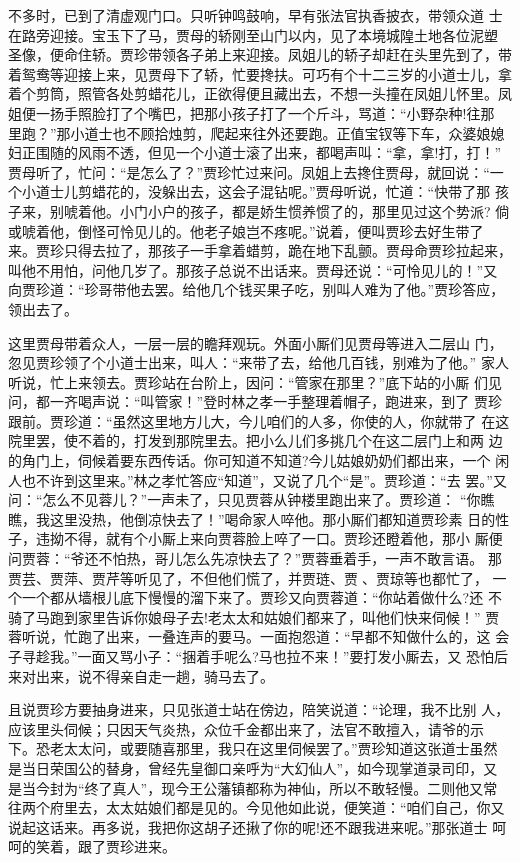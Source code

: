 不多时，已到了清虚观门口。只听钟鸣鼓响，早有张法官执香披衣，带领众道
士在路旁迎接。宝玉下了马，贾母的轿刚至山门以内，见了本境城隍土地各位泥塑
圣像，便命住轿。贾珍带领各子弟上来迎接。凤姐儿的轿子却赶在头里先到了，带
着鸳鸯等迎接上来，见贾母下了轿，忙要搀扶。可巧有个十二三岁的小道士儿，拿
着个剪筒，照管各处剪蜡花儿，正欲得便且藏出去，不想一头撞在凤姐儿怀里。凤
姐便一扬手照脸打了个嘴巴，把那小孩子打了一个斤斗，骂道：“小野杂种!往那
里跑？”那小道士也不顾拾烛剪，爬起来往外还要跑。正值宝钗等下车，众婆娘媳
妇正围随的风雨不透，但见一个小道士滚了出来，都喝声叫：“拿，拿!打，打！”
贾母听了，忙问：“是怎么了？”贾珍忙过来问。凤姐上去搀住贾母，就回说：“一
个小道士儿剪蜡花的，没躲出去，这会子混钻呢。”贾母听说，忙道：“快带了那
孩子来，别唬着他。小门小户的孩子，都是娇生惯养惯了的，那里见过这个势派?
倘或唬着他，倒怪可怜见儿的。他老子娘岂不疼呢。”说着，便叫贾珍去好生带了
来。贾珍只得去拉了，那孩子一手拿着蜡剪，跪在地下乱颤。贾母命贾珍拉起来，
叫他不用怕，问他几岁了。那孩子总说不出话来。贾母还说：“可怜见儿的！”又
向贾珍道：“珍哥带他去罢。给他几个钱买果子吃，别叫人难为了他。”贾珍答应，
领出去了。

这里贾母带着众人，一层一层的瞻拜观玩。外面小厮们见贾母等进入二层山
门，忽见贾珍领了个小道士出来，叫人：“来带了去，给他几百钱，别难为了他。”
家人听说，忙上来领去。贾珍站在台阶上，因问：“管家在那里？”底下站的小厮
们见问，都一齐喝声说：“叫管家！”登时林之孝一手整理着帽子，跑进来，到了
贾珍跟前。贾珍道：“虽然这里地方儿大，今儿咱们的人多，你使的人，你就带了
在这院里罢，使不着的，打发到那院里去。把小么儿们多挑几个在这二层门上和两
边的角门上，伺候着要东西传话。你可知道不知道?今儿姑娘奶奶们都出来，一个
闲人也不许到这里来。”林之孝忙答应“知道”，又说了几个“是”。贾珍道：“去
罢。”又问：“怎么不见蓉儿？”一声未了，只见贾蓉从钟楼里跑出来了。贾珍道：
“你瞧瞧，我这里没热，他倒凉快去了！”喝命家人啐他。那小厮们都知道贾珍素
日的性子，违拗不得，就有个小厮上来向贾蓉脸上啐了一口。贾珍还瞪着他，那小
厮便问贾蓉：“爷还不怕热，哥儿怎么先凉快去了？”贾蓉垂着手，一声不敢言语。
那贾芸、贾萍、贾芹等听见了，不但他们慌了，并贾琏、贾、贾琼等也都忙了，
一个一个都从墙根儿底下慢慢的溜下来了。贾珍又向贾蓉道：“你站着做什么?还
不骑了马跑到家里告诉你娘母子去!老太太和姑娘们都来了，叫他们快来伺候！”
贾蓉听说，忙跑了出来，一叠连声的要马。一面抱怨道：“早都不知做什么的，这
会子寻趁我。”一面又骂小子：“捆着手呢么?马也拉不来！”要打发小厮去，又
恐怕后来对出来，说不得亲自走一趟，骑马去了。

且说贾珍方要抽身进来，只见张道士站在傍边，陪笑说道：“论理，我不比别
人，应该里头伺候；只因天气炎热，众位千金都出来了，法官不敢擅入，请爷的示
下。恐老太太问，或要随喜那里，我只在这里伺候罢了。”贾珍知道这张道士虽然
是当日荣国公的替身，曾经先皇御口亲呼为“大幻仙人”，如今现掌道录司印，又
是当今封为“终了真人”，现今王公藩镇都称为神仙，所以不敢轻慢。二则他又常
往两个府里去，太太姑娘们都是见的。今见他如此说，便笑道：“咱们自己，你又
说起这话来。再多说，我把你这胡子还揪了你的呢!还不跟我进来呢。”那张道士
呵呵的笑着，跟了贾珍进来。

